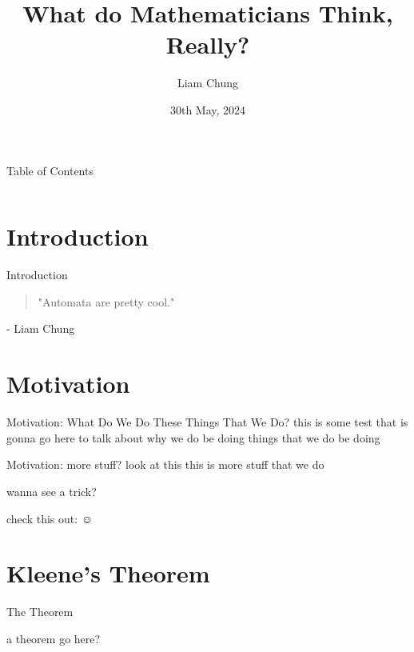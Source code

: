\documentclass{beamer}
\title{What do Mathematicians Think, Really?}
\author{Liam Chung}
\date{30th May, 2024}
\begin{document}
\frame{\titlepage}

\begin{frame}{Table of Contents}
\begin{columns}[t]
    \begin{column}{.5\textwidth}
        \tableofcontents[sections={1-4}, hideallsubsections]
    \end{column}
    \begin{column}{.5\textwidth}
        \tableofcontents[sections={5-8}, hideallsubsections]
    \end{column}
\end{columns}
\end{frame}

\section{Introduction}
    \begin{frame}{Introduction}
        \begin{quote}
            "Automata are pretty cool."
        \end{quote}
        - Liam Chung
    \end{frame}

\section{Motivation}
    \begin{frame}{Motivation: What Do We Do These Things That We Do?}
      this is some test that is gonna go here to talk about why we do be doing things that we do be doing
    \end{frame}
    \begin{frame}{Motivation: more stuff?}
      look at this this is more stuff that we do

      wanna see a trick?

      check this out: $\smiley$
    \end{frame}

\section{Kleene's Theorem}
    \begin{frame}{The Theorem}
      \begin{theorem}
        a theorem go here?
      \end{theorem}
    \end{frame}
\end{document}
